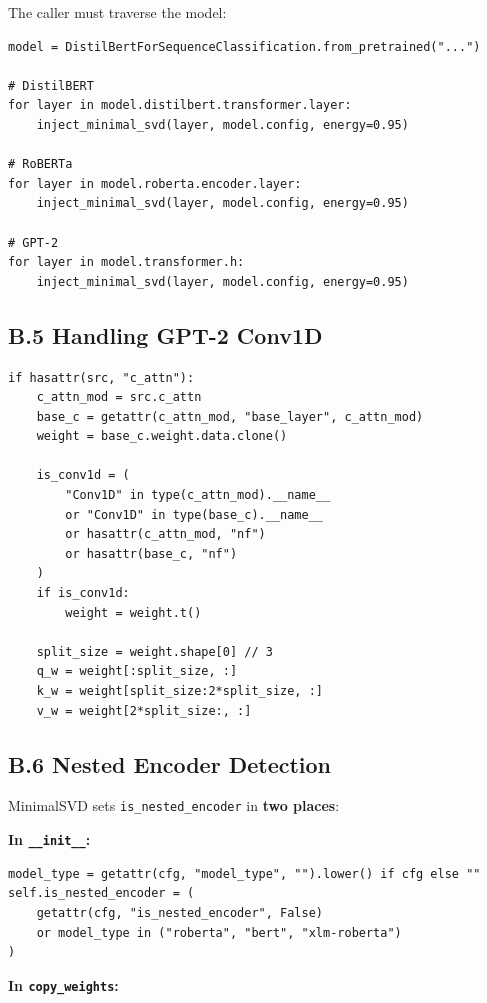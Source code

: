 The caller must traverse the model:

\begin{lstlisting}
model = DistilBertForSequenceClassification.from_pretrained("...")

# DistilBERT
for layer in model.distilbert.transformer.layer:
    inject_minimal_svd(layer, model.config, energy=0.95)

# RoBERTa
for layer in model.roberta.encoder.layer:
    inject_minimal_svd(layer, model.config, energy=0.95)

# GPT-2
for layer in model.transformer.h:
    inject_minimal_svd(layer, model.config, energy=0.95)
\end{lstlisting}

\subsection{B.5 Handling GPT-2 Conv1D}

\begin{lstlisting}
if hasattr(src, "c_attn"):
    c_attn_mod = src.c_attn
    base_c = getattr(c_attn_mod, "base_layer", c_attn_mod)
    weight = base_c.weight.data.clone()
    
    is_conv1d = (
        "Conv1D" in type(c_attn_mod).__name__
        or "Conv1D" in type(base_c).__name__
        or hasattr(c_attn_mod, "nf")
        or hasattr(base_c, "nf")
    )
    if is_conv1d:
        weight = weight.t()
    
    split_size = weight.shape[0] // 3
    q_w = weight[:split_size, :]
    k_w = weight[split_size:2*split_size, :]
    v_w = weight[2*split_size:, :]
\end{lstlisting}

\subsection{B.6 Nested Encoder Detection}

MinimalSVD sets \texttt{is\_nested\_encoder} in \textbf{two places}:

\textbf{In \texttt{\_\_init\_\_}:}

\begin{lstlisting}
model_type = getattr(cfg, "model_type", "").lower() if cfg else ""
self.is_nested_encoder = (
    getattr(cfg, "is_nested_encoder", False)
    or model_type in ("roberta", "bert", "xlm-roberta")
)
\end{lstlisting}

\textbf{In \texttt{copy\_weights}:}

